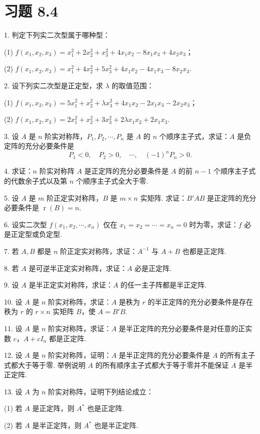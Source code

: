 \documentclass[UTF8, 12pt, fontset=fandol, oneside]{ctexart}
\begin{document}
\section*{习题 8.4}

1. 判定下列实二次型属于哪种型：

(1) $f(x_1,x_2,x_3)=x_1^2+2x_2^2+x_3^2+4x_1x_2-8x_1x_3+4x_2x_3$；

(2) $f(x_1,x_2,x_3)=x_1^2+4x_2^2+5x_3^2+4x_1x_2-4x_1x_3-8x_2x_3$.

2. 设下列实二次型是正定型，求 $\lambda$ 的取值范围：

(1) $f(x_1,x_2,x_3)=5x_1^2+x_2^2+\lambda x_3^2+4x_1x_2-2x_1x_3-2x_2x_3$；

(2) $f(x_1,x_2,x_3)=2x_1^2+x_2^2+3x_3^2+2\lambda x_1x_2+2x_1x_3$.

3. 设 $A$ 是 $n$ 阶实对称阵，$P_1,P_2,\cdots,P_n$ 是 $A$ 的 $n$ 个顺序主子式，求证：$A$ 是负定阵的充分必要条件是
\[
P_1<0,\quad P_2>0,\quad \cdots,\quad (-1)^nP_n>0.
\]

4. 求证：$n$ 阶实对称阵 $A$ 是正定阵的充分必要条件是 $A$ 的前 $n-1$ 个顺序主子式的代数余子式以及第 $n$ 个顺序主子式全大于零.

5. 设 $A$ 是 $m$ 阶正定实对称阵，$B$ 是 $m\times n$ 实矩阵. 求证：$B'AB$ 是正定阵的充分必要条件是 $\operatorname{r}(B)=n$.

6. 设实二次型 $f(x_1,x_2,\cdots,x_n)$ 仅在 $x_1=x_2=\cdots=x_n=0$ 时为零，求证：$f$ 必是正定型或负定型.

7. 若 $A,B$ 都是 $n$ 阶正定实对称阵，求证：$A^{-1}$ 与 $A+B$ 也都是正定阵.

8. 若 $A$ 是可逆半正定实对称阵，求证：$A$ 必是正定阵.

9. 设 $A$ 是半正定实对称阵，求证：$A$ 的任一主子阵都是半正定阵.

10. 设 $A$ 是 $n$ 阶实对称阵，求证：$A$ 是秩为 $r$ 的半正定阵的充分必要条件是存在秩为 $r$ 的 $r\times n$ 实矩阵 $B$，使 $A=B'B$.

11. 设 $A$ 是 $n$ 阶实对称阵，求证：$A$ 是半正定阵的充分必要条件是对任意的正实数 $c$，$A+cI_n$ 都是正定阵.

12. 设 $A$ 是 $n$ 阶实对称阵，证明：$A$ 是半正定阵的充分必要条件是 $A$ 的所有主子式都大于等于零. 举例说明 $A$ 的所有顺序主子式都大于等于零并不能保证 $A$ 是半正定阵.

13. 设 $A$ 为 $n$ 阶实对称阵，证明下列结论成立：

(1) 若 $A$ 是正定阵，则 $A^*$ 也是正定阵.

(2) 若 $A$ 是半正定阵，则 $A^*$ 也是半正定阵.
\end{document}
